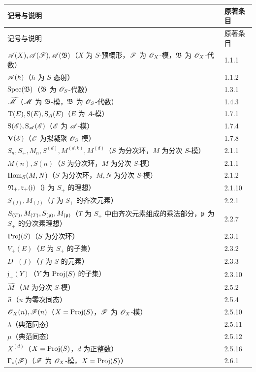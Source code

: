 \begingroup\small
\begin{longtable}{@{}p{}@{\hspace{1em}}p{}@{}}
\toprule 记号与说明 & 原著条目\\\midrule\endfirsthead
\toprule 记号与说明 & 原著条目\\\midrule\endhead
\bottomrule\endfoot
$\mathscr A(X),\mathscr A(\mathscr F),\mathscr A(\mathfrak B)$（$X$ 为 $S$-预概形，$\mathscr F$ 为 $\mathscr O_X$-模，$\mathfrak B$ 为 $\mathscr O_X$-代数）&1.1.1\\
$\mathscr A(h)$（$h$ 为 $S$-态射）&1.1.2\\
$\operatorname{Spec}(\mathfrak B)$（$\mathfrak B$ 为 $\mathscr O_S$-代数）&1.3.1\\
$\widetilde{\mathscr M}$（$\mathscr M$ 为 $\mathfrak B$-模，$\mathfrak B$ 为 $\mathscr O_S$-代数）&1.4.3\\
$\mathrm T(E),\operatorname{S}(E),\operatorname{S}_A(E)$（$E$ 为 $A$-模）&1.7.1\\
$\operatorname{S}(\mathscr E),\operatorname{S}_{\mathscr A}(\mathscr E)$（$\mathscr E$ 为 $\mathscr A$-模）&1.7.4\\
$\mathbf V(\mathscr E)$（$\mathscr E$ 为拟凝聚 $\mathscr O_S$-模）&1.7.8\\
$S_n,S_+,M_n,S^{(d)},M^{(d,k)},M^{(d)}$（$S$ 为分次环，$M$ 为分次 $S$-模）&2.1.1\\
$M(n),S(n)$（$S$ 为分次环，$M$ 为分次 $S$-模）&2.1.1\\
$\operatorname{Hom}_S(M,N)$（$S$ 为分次环，$M,N$ 为分次 $S$-模）&2.1.2\\
$\mathfrak N_+,\mathfrak r_+(\mathfrak j)$（$\mathfrak j$ 为 $S_+$ 的理想）&2.1.10\\
$S_{(f)},M_{(f)}$（$f$ 为 $S_+$ 的齐次元素）&2.2.1\\
$S_{(T)},M_{(T)},S_{(\mathfrak p)},M_{(\mathfrak p)}$（$T$ 为 $S_+$ 中由齐次元素组成的乘法部分，$\mathfrak p$ 为 $S_+$ 的分次素理想）&2.2.7\\
$\operatorname{Proj}(S)$（$S$ 为分次环）&2.3.1\\
$V_+(E)$（$E$ 为 $S_+$ 的子集）&2.3.2\\
$D_+(f)$（$f$ 为 $S$ 的元素）&2.3.3\\
$\mathfrak j_+(Y)$（$Y$ 为 $\operatorname{Proj}(S)$ 的子集）&2.3.10\\
$\widetilde{M}$（$M$ 为分次 $S$-模）&2.5.2\\
$\widetilde{u}$（$u$ 为零次同态）&2.5.4\\
$\mathscr O_X(n),\mathscr F(n)$（$X=\operatorname{Proj}(S)$，$\mathscr F$ 为 $\mathscr O_X$-模）&2.5.10\\
$\lambda$（典范同态）&2.5.11\\
$\mu$（典范同态）&2.5.12\\
$X^{(d)}$（$X=\operatorname{Proj}(S)$，$d$ 为正整数）&2.5.16\\
$\Gamma_*(\mathscr F)$（$\mathscr F$ 为 $\mathscr O_X$-模，$X=\operatorname{Proj}(S)$）&2.6.1\\

\end{longtable}
